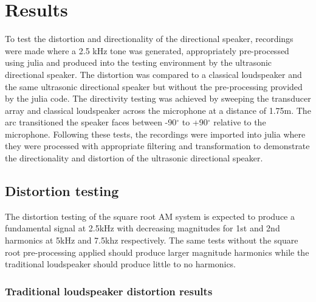 \section{Results}
To test the distortion and directionality of the directional speaker, recordings were made where a 2.5 kHz tone was generated, appropriately pre-processed using julia and produced into the testing environment by the ultrasonic directional speaker. The distortion was compared to a classical loudspeaker and the same ultrasonic directional speaker but without the pre-processing provided by the julia code. The directivity testing was achieved by sweeping the transducer array and classical loudspeaker across the microphone at a distance of 1.75m. The arc transitioned the speaker faces between -90$^\circ$ to +90$^\circ$ relative to the microphone. Following these tests, the recordings were imported into julia where they were processed with appropriate filtering and transformation to demonstrate the directionality and distortion of the ultrasonic directional speaker.
\subsection{Distortion testing}
The distortion testing of the square root AM system is expected to produce a fundamental signal at 2.5kHz with decreasing magnitudes for 1st and 2nd harmonics at 5kHz and 7.5khz respectively. The same tests without the square root pre-processing applied should produce larger magnitude harmonics while the traditional loudspeaker should produce little to no harmonics.
\subsubsection{Traditional loudspeaker distortion results}

